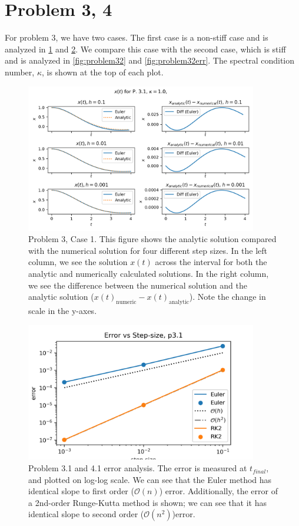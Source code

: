 \documentclass[10pt,letterpaper,notitlepage]{article}
\begin{document}
    \section{Problem 3, 4}
    \label{sec:problem3}
    For problem 3, we have two cases. The first case is a non-stiff case and is analyzed in \cref{fig:problem31} and \cref{fig:problem31err}. We compare this case with the second case, which is stiff and is analyzed in \cref{fig:problem32} and \cref{fig:problem32err}. The spectral condition number, $\kappa$, is shown at the top of each plot.
    \begin{figure}
        \centering
        \includegraphics[width=0.9\textwidth]{../figures/p31.png}
        \caption{Problem 3, Case 1. This figure shows the analytic solution compared with the numerical solution for four different step sizes. In the left column, we see the solution $x(t)$ across the interval for both the analytic and numerically calculated solutions. In the right column, we see the difference between the numerical solution and the analytic solution ($x(t)_{\text{numeric}} - x(t)_{\text{analytic}}$). Note the change in scale in the y-axes.}
        \label{fig:problem31}
    \end{figure}
    \begin{figure}[h]
        \centering
        \includegraphics[width=0.9\textwidth]{../figures/p31err.png}
        \caption{Problem 3.1 and 4.1 error analysis. The error is measured at $t_{final}$, and plotted on log-log scale. We can see that the Euler method has identical slope to first order ($\mathcal{O}(n)$) error. Additionally, the error of a 2nd-order Runge-Kutta method is shown; we can see that it has identical slope to second order ($\mathcal{O}(n^2)$)error.}
        \label{fig:problem31err}
    \end{figure}
\end{document}
